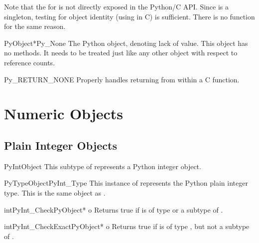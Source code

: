 Note that the  for  is not directly
exposed in the Python/C API.  Since  is a singleton,
testing for object identity (using \samp{==} in C) is sufficient.
There is no  function for the same reason.

\begin{cvardesc}{PyObject*}{Py_None}
  The Python  object, denoting lack of value.  This object
  has no methods.  It needs to be treated just like any other object
  with respect to reference counts.
\end{cvardesc}

\begin{csimplemacrodesc}{Py_RETURN_NONE}
  Properly handles returning  from within a C function.
\end{csimplemacrodesc}


\section{Numeric Objects \label{numericObjects}}



\subsection{Plain Integer Objects \label{intObjects}}

\begin{ctypedesc}{PyIntObject}
  This subtype of  represents a Python integer
  object.
\end{ctypedesc}

\begin{cvardesc}{PyTypeObject}{PyInt_Type}
  This instance of  represents the Python plain
  integer type.  This is the same object as .
\end{cvardesc}

\begin{cfuncdesc}{int}{PyInt_Check}{PyObject* o}
  Returns true if  is of type  or a subtype
  of .
\end{cfuncdesc}

\begin{cfuncdesc}{int}{PyInt_CheckExact}{PyObject* o}
  Returns true if  is of type , but not a
  subtype of .
\end{cfuncdesc}

